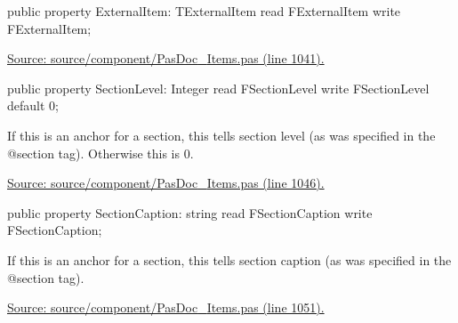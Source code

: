 \documentclass{report}
\newif\ifpdf
\begin{document}
\begin{list}{}{
\setlength{\itemindent}{0cm}
\setlength{\listparindent}{0cm}
\setlength{\leftmargin}{\evensidemargin}
\addtolength{\leftmargin}{\tmplength}
\settowidth{\labelsep}{X}
\addtolength{\leftmargin}{\labelsep}
\setlength{\labelwidth}{\tmplength}
}
\label{PasDoc_Items.TAnchorItem-ExternalItem}
\item[\textbf{ExternalItem}\hfill]
\ifpdf
\begin{flushleft}
\fi
\begin{ttfamily}
public property ExternalItem: TExternalItem read FExternalItem write FExternalItem;\end{ttfamily}

\ifpdf
\end{flushleft}
\fi


\par  \par
\href{https://github.com/pasdoc/pasdoc/blob/master/source/component/PasDoc_Items.pas#L1041}{Source: source/component/PasDoc{\_}Items.pas (line 1041).}\label{PasDoc_Items.TAnchorItem-SectionLevel}
\item[\textbf{SectionLevel}\hfill]
\ifpdf
\begin{flushleft}
\fi
\begin{ttfamily}
public property SectionLevel: Integer
      read FSectionLevel write FSectionLevel default 0;\end{ttfamily}

\ifpdf
\end{flushleft}
\fi


\par If this is an anchor for a section, this tells section level (as was specified in the @section tag). Otherwise this is 0.\par
\href{https://github.com/pasdoc/pasdoc/blob/master/source/component/PasDoc_Items.pas#L1046}{Source: source/component/PasDoc{\_}Items.pas (line 1046).}\label{PasDoc_Items.TAnchorItem-SectionCaption}
\item[\textbf{SectionCaption}\hfill]
\ifpdf
\begin{flushleft}
\fi
\begin{ttfamily}
public property SectionCaption: string
      read FSectionCaption write FSectionCaption;\end{ttfamily}

\ifpdf
\end{flushleft}
\fi


\par If this is an anchor for a section, this tells section caption (as was specified in the @section tag).\par
\href{https://github.com/pasdoc/pasdoc/blob/master/source/component/PasDoc_Items.pas#L1051}{Source: source/component/PasDoc{\_}Items.pas (line 1051).}\end{list}
\ifpdf
\end{document}
